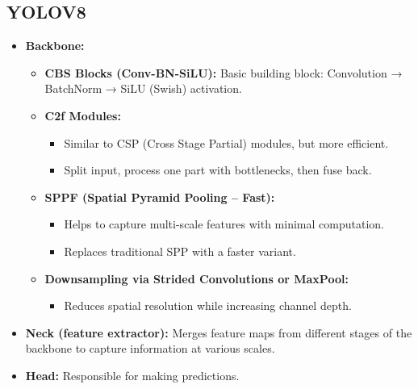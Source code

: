 \documentclass[12pt,a4paper]{article}
\begin{document}
\subsection{YOLOV8}
\begin{itemize}
\item \textbf {Backbone: } 
    \begin{itemize}
        \item \textbf {CBS Blocks (Conv-BN-SiLU):} Basic building block: Convolution → BatchNorm → SiLU (Swish) activation.
        \item \textbf {C2f Modules:} 
            \begin{itemize}
                \item Similar to CSP (Cross Stage Partial) modules, but more efficient. \item Split input, process one part with bottlenecks, then fuse back. 
            \end{itemize}
                
        \item \textbf {SPPF (Spatial Pyramid Pooling – Fast):}
            \begin{itemize}
                \item Helps to capture multi-scale features with minimal computation.
                \item Replaces traditional SPP with a faster variant.
            \end{itemize}
        \item \textbf {Downsampling via Strided Convolutions or MaxPool:}
            \begin{itemize}
                \item Reduces spatial resolution while increasing channel depth.
            \end{itemize}
    \end{itemize}
\item \textbf {Neck (feature extractor):} 
             Merges feature maps from different stages of the backbone to capture information at various scales.

\item \textbf{Head:} Responsible for making predictions. 
\end{itemize}
\end{document}
